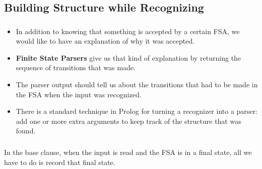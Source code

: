 \subsection{Building Structure while Recognizing}

\begin{frame}

	\frametitle{\insertsection}
	\framesubtitle{\insertsubsection}
	
	\begin{itemize}
		\item In addition to knowing that something is accepted by a certain FSA, we would like to have an explanation of why it was accepted.
		\item \textbf{Finite State Parsers} give us that kind of explanation by returning the sequence of transitions that was made.
		\item The parser output should tell us about the transitions that had to be made in the FSA when the input was recognized.
		\item There is a standard technique in Prolog for turning a recognizer into a parser: add one or more extra arguments to keep track of the structure that was found.
	\end{itemize}

\end{frame}


\begin{frame}

	\frametitle{\insertsection}
	\framesubtitle{\insertsubsection}
	
	In the base clause, when the input is read and the FSA is in a final state, all we have to do is record that final state.
	


\end{frame}


